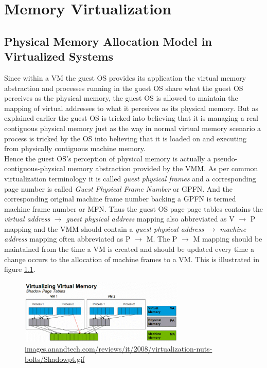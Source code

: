 \chapter{Memory Virtualization}

\section{Physical Memory Allocation Model in Virtualized Systems} \label{model}
Since within a VM the guest OS provides its application the virtual memory abstraction and
processes running in the guest OS share what the guest OS perceives as the physical memory, the
guest OS is allowed to maintain the mapping of virtual addresses to what it perceives as its
physical memory. But as explained earlier the guest OS is tricked into believing that it is
managing a real contiguous physical memory just as the way in normal virtual memory scenario a
process is tricked by the OS into believing that it is loaded on and executing from physically
contiguous machine memory.\\
Hence the guest OS's perception of physical memory is actually a pseudo-contiguous-physical memory
abstraction provided by the VMM. As per common virtualization terminology it is called
\textit{guest physical frames} and a corresponding page number is called \textit{Guest Physical
Frame Number} or GPFN. And the corresponding original machine frame number backing a GPFN is
termed machine frame number or MFN. Thus the guest OS page page tables contains the \textit{virtual address} $\rightarrow$ \textit{guest physical address} mapping also abbreviated as V $\rightarrow$ P mapping and the VMM should contain a \textit{guest physical address} $\rightarrow$ \textit{machine address} mapping often abbreviated as P $\rightarrow$ M. The P $\rightarrow$ M mapping should be maintained from the time a VM is created and should be updated every time a change occurs to the allocation of machine frames to a VM. This is illustrated in figure \ref{fig:allocmodel}.

\begin{figure}[tbp]
  \begin{center}
    \includegraphics[width=0.7\textwidth]{images/allocmodel}
    		{\url{images.anandtech.com/reviews/it/2008/virtualization-nuts-bolts/Shadowpt.gif}}  
    \label{fig:allocmodel}
     \end{center}
\end{figure}

